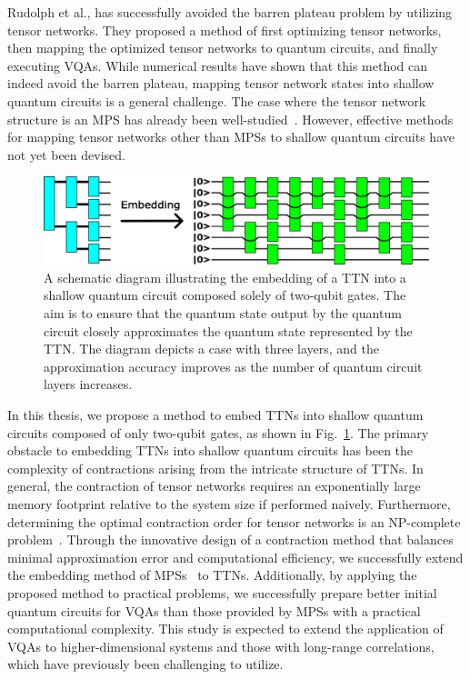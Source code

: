 \documentclass[12pt,dvipdfmx,twoside,openright]{report}
\begin{document}
Rudolph et al., has successfully avoided the barren plateau problem by utilizing tensor networks\cite{rudolph2023synergistic}.
They proposed a method of first optimizing tensor networks, then mapping the optimized tensor networks to quantum circuits, and finally executing VQAs.
While numerical results have shown that this method can indeed avoid the barren plateau, mapping tensor network states into shallow quantum circuits is a general challenge.
The case where the tensor network structure is an MPS has already been well-studied~\cite{EncodingMPS,mpsdecomp,mpsoptim,mpspreparation}.
However, effective methods for mapping tensor networks other than MPSs to shallow quantum circuits have not yet been devised.
\begin{figure}
    \centering
    \includegraphics[width=\linewidth]{fig-task-setting.pdf}
    \caption{A schematic diagram illustrating the embedding of a TTN into a shallow quantum circuit composed solely of two-qubit gates. The aim is to ensure that the quantum state output by the quantum circuit closely approximates the quantum state represented by the TTN. The diagram depicts a case with three layers, and the approximation accuracy improves as the number of quantum circuit layers increases.}
    \label{fig:task-setting}
\end{figure}

In this thesis, we propose a method to embed TTNs into shallow quantum circuits composed of only two-qubit gates, as shown in Fig.~\ref{fig:task-setting}.
The primary obstacle to embedding TTNs into shallow quantum circuits has been the complexity of contractions arising from the intricate structure of TTNs.
In general, the contraction of tensor networks requires an exponentially large memory footprint relative to the system size if performed naively.
Furthermore, determining the optimal contraction order for tensor networks is an NP-complete problem~\cite{np-complete}.
Through the innovative design of a contraction method that balances minimal approximation error and computational efficiency, we successfully extend the embedding method of MPSs~\cite{mpsdecomp} to TTNs.
Additionally, by applying the proposed method to practical problems, we successfully prepare better initial quantum circuits for VQAs than those provided by MPSs with a practical computational complexity.
This study is expected to extend the application of VQAs to higher-dimensional systems and those with long-range correlations, which have previously been challenging to utilize.
\end{document}
